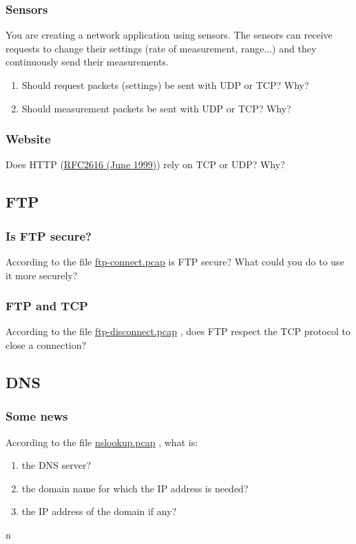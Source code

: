 \documentclass[11pt]{article}
\begin{document}
\subsubsection{Sensors}
You are creating a network application using sensors. The sensors can receive requests to change their settings (rate of measurement, range...) and they continuously send their measurements.
  \begin{enumerate}
    \item Should request packets (settings) be sent with UDP or TCP? Why?
    \item Should measurement packets be sent with UDP or TCP? Why?
  \end{enumerate}
\subsubsection{Website}
Does HTTP (\color{blue}\href{http://tools.ietf.org/html/rfc2616}{RFC2616 (June 1999)}) \color{black} rely on TCP or UDP? Why?

\subsection{FTP}
\subsubsection{Is FTP secure?}
According to the file \color{blue}\href{http://teaching.auzias.net/db/ftp-connect.pcap}{ftp-connect.pcap} \color{black} is FTP secure? What could you do to use it more securely?
\subsubsection{FTP and TCP}
According to the file \color{blue}\href{http://teaching.auzias.net/db/ftp-disconnect.pcap}{ftp-disconnect.pcap} \color{black}, does FTP respect the TCP protocol to close a connection?

\subsection{DNS}
\subsubsection{Some news}
According to the file \color{blue}\href{http://teaching.auzias.net/db/nslookup.pcap}{nslookup.pcap} \color{black}, what is:
  \begin{enumerate}
    \item the DNS server?
    \item the domain name for which the IP address is needed?
    \item the IP address of the domain if any?
  \end{enumerate}n
\end{document}
